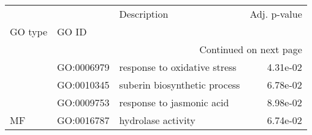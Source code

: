 \begin{longtable}{lllr}
\toprule
   &            &                   Description &  Adj. p-value \\
GO type & GO ID &                               &               \\
\midrule
\endhead
\midrule
\multicolumn{4}{r}{{Continued on next page}} \\
\midrule
\endfoot

\bottomrule
\endlastfoot
\multirow{3}{*}{BP} & GO:0006979 &  response to oxidative stress &      4.31e-02 \\
   & GO:0010345 &  suberin biosynthetic process &      6.78e-02 \\
   & GO:0009753 &     response to jasmonic acid &      8.98e-02 \\
\cline{1-4}
MF & GO:0016787 &            hydrolase activity &      6.74e-02 \\
\end{longtable}